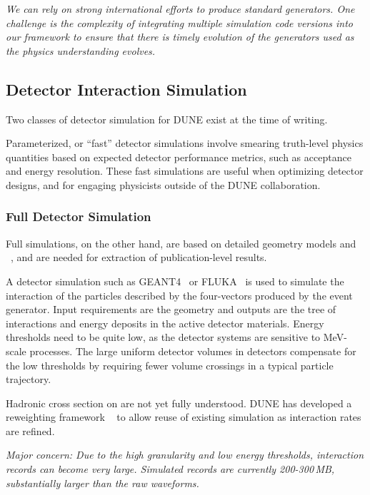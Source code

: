 \documentclass[../main-v1.tex]{subfiles}
\begin{document}
{\it We can rely on strong international efforts to produce standard generators. One challenge is the complexity of integrating multiple simulation code versions into our framework to ensure that there is timely evolution of the generators used as the physics understanding evolves.}

\subsection{Detector Interaction Simulation}

Two classes of detector simulation for DUNE exist at the time of writing. 

Parameterized, or ``fast'' detector simulations involve smearing truth-level physics quantities based on expected detector performance metrics, such as acceptance and energy resolution.  These fast simulations are useful when optimizing detector designs, and for engaging physicists outside of the DUNE collaboration.  

\subsubsection{Full Detector Simulation} 
Full simulations, on the other hand, are based on detailed geometry models and ~\cite{Agostinelli:2002hh,Allison:2016lfl}, and are needed for extraction of publication-level results.

A detector simulation such as GEANT4~\cite{Allison:2016lfl} or FLUKA~\cite{Bohlen:2014buj} is used to simulate the interaction of the particles described by the four-vectors produced by the event generator. Input requirements are the geometry and outputs are the tree of interactions and energy deposits in the active detector materials. 
Energy thresholds need to be quite low, as the detector systems are sensitive to MeV-scale processes. The large uniform detector volumes in  detectors compensate for the low thresholds by requiring fewer volume crossings in a typical particle trajectory.  

Hadronic cross section on  are not yet fully understood.  DUNE has developed a reweighting framework 
~\cite{Calcutt:2021zck} to allow reuse of existing simulation as interaction rates are refined.

{\it Major concern: Due to the high granularity and low energy thresholds, interaction records can become very large. Simulated  records are currently 200-300\,MB, substantially larger than the raw waveforms.}
\end{document}
